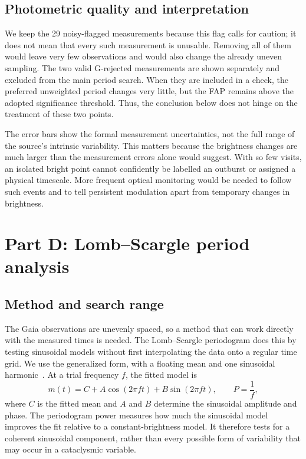 \documentclass[12pt,a4paper]{article}
\begin{document}
\subsection{Photometric quality and interpretation}
We keep the 29 noisy-flagged measurements because this flag calls for caution; it does not mean that every such measurement is unusable. Removing all of them would leave very few observations and would also change the already uneven sampling. The two valid G-rejected measurements are shown separately and excluded from the main period search. When they are included in a check, the preferred unweighted period changes very little, but the FAP remains above the adopted significance threshold. Thus, the conclusion below does not hinge on the treatment of these two points.

The error bars show the formal measurement uncertainties, not the full range of the source's intrinsic variability. This matters because the brightness changes are much larger than the measurement errors alone would suggest. With so few visits, an isolated bright point cannot confidently be labelled an outburst or assigned a physical timescale. More frequent optical monitoring would be needed to follow such events and to tell persistent modulation apart from temporary changes in brightness.
\FloatBarrier

\section{Part D: Lomb--Scargle period analysis}
\subsection{Method and search range}
The Gaia observations are unevenly spaced, so a method that can work directly with the measured times is needed. The Lomb--Scargle periodogram does this by testing sinusoidal models without first interpolating the data onto a regular time grid. We use the generalized form, with a floating mean and one sinusoidal harmonic~\cite{vanderplas2018,astropy2022}. At a trial frequency $f$, the fitted model is
\begin{equation}
m(t)=C+A\cos(2\pi f t)+B\sin(2\pi f t),\qquad P=\frac{1}{f},
\end{equation}
where $C$ is the fitted mean and $A$ and $B$ determine the sinusoidal amplitude and phase. The periodogram power measures how much the sinusoidal model improves the fit relative to a constant-brightness model. It therefore tests for a coherent sinusoidal component, rather than every possible form of variability that may occur in a cataclysmic variable.
\end{document}
